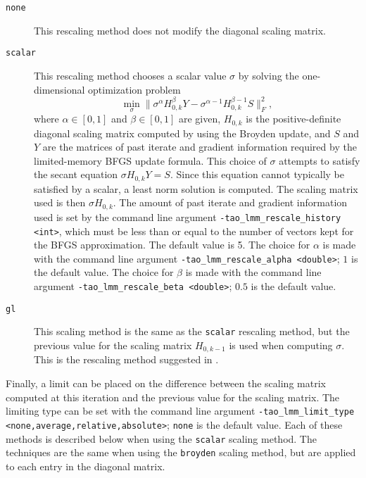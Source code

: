 \begin{description}
\item[{\tt none}] This rescaling method does not modify the diagonal scaling
matrix.
\item[{\tt scalar}] This rescaling method chooses a scalar value $\sigma$ by 
solving the one-dimensional optimization problem
\[
\min_\sigma \|\sigma^\alpha H_{0,k}^{\beta} Y - \sigma^{\alpha - 1} H_{0,k}^{\beta - 1} S\|_F^2,
\]
where $\alpha \in [0,1]$ and $\beta \in [0,1]$ are given, $H_{0,k}$ is the 
positive-definite diagonal scaling matrix computed by using the Broyden 
update, and $S$ and $Y$ are the matrices of past iterate and gradient
information required by the limited-memory BFGS update formula.  This 
choice of $\sigma$ attempts to satisfy the secant equation 
$\sigma H_{0,k} Y = S$.  Since this equation cannot typically be satisfied 
by a scalar, a least norm solution is computed.  The scaling matrix used is 
then $\sigma H_{0,k}$.  The amount of past iterate and gradient information 
used is set by the command line argument 
{\tt -tao\_lmm\_rescale\_history <int>}, which must be less than or equal
to the number of vectors kept for the BFGS approximation.  The default value 
is 5.  The choice for $\alpha$ is made with the command
line argument {\tt -tao\_lmm\_rescale\_alpha <double>}; $1$ is the default
value.  The choice for $\beta$ is made with the command line argument 
{\tt -tao\_lmm\_rescale\_beta <double>}; $0.5$ is the default value.
\item[{\tt gl}] This scaling method is the same as the {\tt scalar} rescaling 
method, but the previous value for the scaling matrix $H_{0,k-1}$ is used when 
computing $\sigma$.  This is the rescaling method suggested in 
\cite{Gilbert-Lemarechal}.
\end{description}

Finally, a limit can be placed on the difference between the scaling
matrix computed at this iteration and the previous value for the
scaling matrix.  The limiting type can be set with the command line 
argument {\tt -tao\_lmm\_limit\_type <none,average,relative,absolute>};
{\tt none} is the default value.  Each of these methods is described 
below when using the {\tt scalar} scaling method.  The techniques are
the same when using the {\tt broyden} scaling method, but are applied
to each entry in the diagonal matrix.

